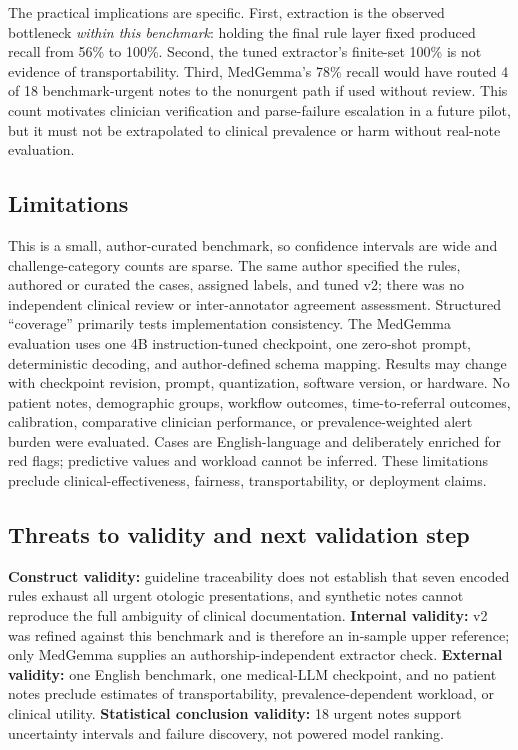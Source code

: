 \documentclass[11pt]{article}
\begin{document}
The practical implications are specific. First, extraction is the observed bottleneck \emph{within this benchmark}: holding the final rule layer fixed produced recall from 56\% to 100\%. Second, the tuned extractor's finite-set 100\% is not evidence of transportability. Third, MedGemma's 78\% recall would have routed 4 of 18 benchmark-urgent notes to the nonurgent path if used without review. This count motivates clinician verification and parse-failure escalation in a future pilot, but it must not be extrapolated to clinical prevalence or harm without real-note evaluation.

\subsection{Limitations}
This is a small, author-curated benchmark, so confidence intervals are wide and challenge-category counts are sparse. The same author specified the rules, authored or curated the cases, assigned labels, and tuned v2; there was no independent clinical review or inter-annotator agreement assessment. Structured ``coverage'' primarily tests implementation consistency. The MedGemma evaluation uses one 4B instruction-tuned checkpoint, one zero-shot prompt, deterministic decoding, and author-defined schema mapping. Results may change with checkpoint revision, prompt, quantization, software version, or hardware. No patient notes, demographic groups, workflow outcomes, time-to-referral outcomes, calibration, comparative clinician performance, or prevalence-weighted alert burden were evaluated. Cases are English-language and deliberately enriched for red flags; predictive values and workload cannot be inferred. These limitations preclude clinical-effectiveness, fairness, transportability, or deployment claims.

\subsection{Threats to validity and next validation step}
\textbf{Construct validity:} guideline traceability does not establish that seven encoded rules exhaust all urgent otologic presentations, and synthetic notes cannot reproduce the full ambiguity of clinical documentation. \textbf{Internal validity:} v2 was refined against this benchmark and is therefore an in-sample upper reference; only MedGemma supplies an authorship-independent extractor check. \textbf{External validity:} one English benchmark, one medical-LLM checkpoint, and no patient notes preclude estimates of transportability, prevalence-dependent workload, or clinical utility. \textbf{Statistical conclusion validity:} 18 urgent notes support uncertainty intervals and failure discovery, not powered model ranking.
\end{document}

